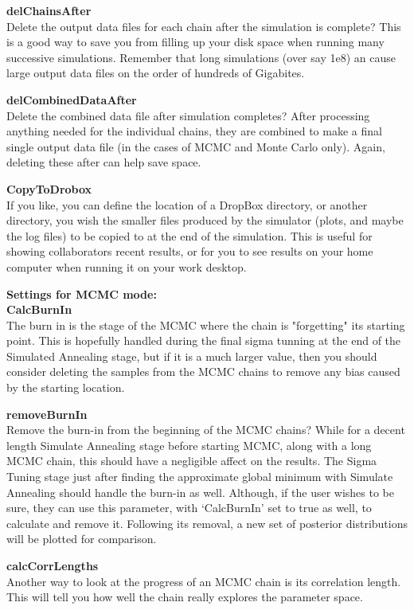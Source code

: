 \documentclass[12pt,preprint]{aastex}
\begin{document}
{\bf delChainsAfter}\\
Delete the output data files for each chain after the simulation is complete?  This is a good way to save you from filling up your disk space when running many successive simulations.  Remember that long simulations (over say 1e8) an cause large output data files on the order of hundreds of Gigabites.

{\bf delCombinedDataAfter}\\
Delete the combined data file after simulation completes?  After processing anything needed for the individual chains, they are combined to make a final single output data file (in the cases of MCMC and Monte Carlo only).  Again, deleting these after can help save space.

{\bf CopyToDrobox}\\
If you like, you can define the location of a DropBox directory, or another directory, you wish the smaller files produced by the simulator (plots, and maybe the log files) to be copied to at the end of the simulation.  This is useful for showing collaborators recent results, or for you to see results on your home computer when running it on your work desktop.

{\bf \color{blue} Settings for MCMC mode: }\\
{\bf CalcBurnIn}\\
The burn in is the stage of the MCMC where the chain is "forgetting" its starting point.  This is hopefully handled during the final sigma tunning at the end of the Simulated Annealing stage, but if it is a much larger value, then you should consider deleting the samples from the MCMC chains to remove any bias caused by the starting location.

{\bf removeBurnIn}\\
Remove the burn-in from the beginning of the MCMC chains?  While for a decent length Simulate Annealing stage before starting MCMC, along with a long MCMC chain, this should have a negligible affect on the results.  The Sigma Tuning stage just after finding the approximate global minimum with Simulate Annealing should handle the burn-in as well.  Although, if the user wishes to be sure, they can use this parameter, with `CalcBurnIn' set to true as well, to calculate and remove it.  Following its removal, a new set of posterior distributions will be plotted for comparison.

{\bf calcCorrLengths}\\
Another way to look at the progress of an MCMC chain is its correlation length.  This will tell you how well the chain really explores the parameter space.
\end{document}
